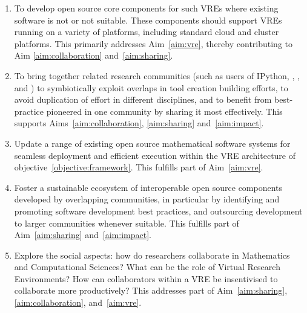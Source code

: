 \documentclass[noworkareas,deliverables,\classoptions]{euproposal}       %
\begin{document}
\begin{proposal}
\begin{enumerate}
\item\label{objectives:core} To develop open source core components
  for such VREs where existing software is not  or not suitable. These
  components should support VREs running on a variety of
  platforms, including standard cloud and cluster platforms. This primarily
  addresses Aim~\ref{aim:vre}, thereby contributing to Aim
  \ref{aim:collaboration} and~\ref{aim:sharing}.

\item \label{objective:community} To bring together related research
  communities (such as users of IPython, \Sage, \Singular, and \GAP)
  to symbiotically exploit overlaps in tool creation building efforts,
  to avoid duplication of effort in different disciplines, and to
  benefit from best-practice pioneered in one community by sharing it
  most effectively. This supports Aims~\ref{aim:collaboration},
  \ref{aim:sharing} and~\ref{aim:impact}.

\item \label{objective:updates} Update a range of existing open source
  mathematical software systems for seamless deployment and efficient
  execution within the VRE architecture of objective~\ref{objective:framework}.
  This fulfills part of Aim~\ref{aim:vre}.



\item \label{objective:sustainable} Foster a sustainable ecosystem of
  interoperable open source components developed by overlapping
  communities, in particular by identifying and promoting software
  development best practices, and outsourcing development to larger
  communities whenever suitable. This fulfills part of
  Aim~\ref{aim:sharing} and~\ref{aim:impact}.

\item \label{objective:social} Explore the social aspects: how do
  researchers collaborate in Mathematics and Computational Sciences? What can be the role of
  Virtual Research Environments?  How can collaborators within a VRE be insentivised 
  to collaborate more productively? This addresses part of
  Aim~\ref{aim:sharing}, \ref{aim:collaboration},  and~\ref{aim:vre}.


\end{enumerate}
\end{proposal}
\end{document}
